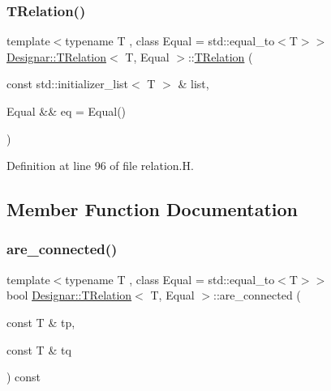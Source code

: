\mbox{\label{class_designar_1_1_t_relation_ac745ed02be7d1aac2a70473fc1d4b4b7}} 
\subsubsection{\texorpdfstring{T\+Relation()}{TRelation()}\hspace{0.1cm}{\footnotesize\ttfamily [4/4]}}
{\footnotesize\ttfamily template$<$typename T , class Equal  = std\+::equal\+\_\+to$<$\+T$>$$>$ \\
\hyperlink{class_designar_1_1_t_relation}{Designar\+::\+T\+Relation}$<$ T, Equal $>$\+::\hyperlink{class_designar_1_1_t_relation}{T\+Relation} (\begin{DoxyParamCaption}\item[{const std\+::initializer\+\_\+list$<$ T $>$ \&}]{list,  }\item[{Equal \&\&}]{eq = {\ttfamily Equal()} }\end{DoxyParamCaption})\hspace{0.3cm}{\ttfamily [inline]}}



Definition at line 96 of file relation.\+H.



\subsection{Member Function Documentation}
\mbox{\label{class_designar_1_1_t_relation_a1746e01b4c0e1d96aca73ad8d6b66ad1}} 
\subsubsection{\texorpdfstring{are\+\_\+connected()}{are\_connected()}}
{\footnotesize\ttfamily template$<$typename T , class Equal  = std\+::equal\+\_\+to$<$\+T$>$$>$ \\
bool \hyperlink{class_designar_1_1_t_relation}{Designar\+::\+T\+Relation}$<$ T, Equal $>$\+::are\+\_\+connected (\begin{DoxyParamCaption}\item[{const T \&}]{tp,  }\item[{const T \&}]{tq }\end{DoxyParamCaption}) const\hspace{0.3cm}{\ttfamily [inline]}}



